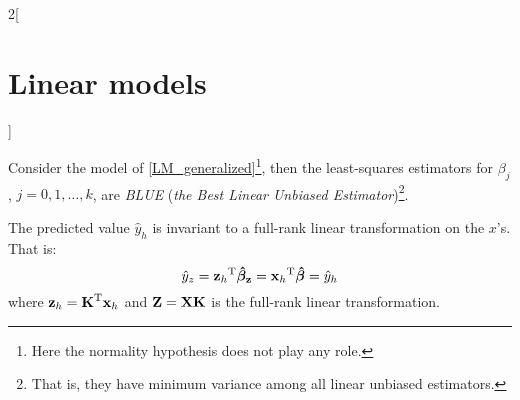 \documentclass[../../../main_math.tex]{subfiles}
\begin{document}
\begin{multicols}{2}[\section{Linear models}]
\begin{proposition}
  \end{proposition}
  \begin{theorem}
    Consider the model of \cref{LM_generalized}\footnote{Here the normality hypothesis does not play any role.}, then the least-squares estimators for $\beta_j$, $j=0,1,\ldots,k$, are \emph{BLUE} (\emph{the Best Linear Unbiased Estimator})\footnote{That is, they have minimum variance among all linear unbiased estimators.}.
  \end{theorem}
  \begin{corollary}
    The predicted value $\hat{y}_h$ is invariant to a full-rank linear transformation on the $x$'s. That is: $$\hat{y}_z={\boldsymbol{\mathrm{z}}_h}^{\mathrm{T}}\boldsymbol{\mathrm{\hat{\beta}_z}}={\boldsymbol{\mathrm{x}}_h}^{\mathrm{T}}\boldsymbol{\mathrm{\hat{\beta}}}=\hat{y}_h$$ where $\boldsymbol{\mathrm{z}}_h={\boldsymbol{\mathrm{K}}}^{\mathrm{T}}\boldsymbol{\mathrm{x}}_h$ and $\boldsymbol{\mathrm{Z}}=\boldsymbol{\mathrm{XK}}$ is the full-rank linear transformation.
  \end{corollary}

\end{multicols}
\end{document}
